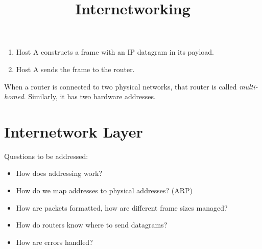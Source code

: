 \documentclass{article}
\title{Internetworking}
\begin{document}
\begin{enumerate}
    \item Host A constructs a frame with an IP datagram in its payload.
    \item Host A sends the frame to the router.
\end{enumerate}

When a router is connected to two physical networks, that router is called \emph{multi-homed}.
Similarly, it has two hardware addresses.

\section*{Internetwork Layer}
Questions to be addressed:
\begin{itemize}
    \item \setlength{\itemsep}{0em} How does addressing work?
    \item How do we map addresses to physical addresses? (ARP)
    \item How are packets formatted, how are different frame sizes managed?
    \item How do routers know where to send datagrams?
    \item How are errors handled?
\end{itemize}
\end{document}
